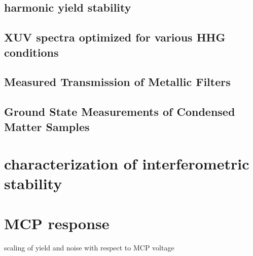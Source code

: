 \subsection{harmonic yield stability}

\subsection{XUV spectra optimized for various HHG conditions}

\subsection{Measured Transmission of Metallic Filters}

\subsection{Ground State Measurements of Condensed Matter Samples}

\section{characterization of interferometric stability}

\section{MCP response}
scaling of yield and noise with respect to MCP voltage
